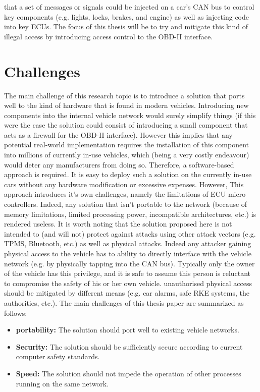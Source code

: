 \cite{MillerA}\cite{Yadav16}\cite{MillerB}\cite{MillerC} that a set of messages or signals could be injected on a car's CAN bus to control key components (e.g. lights, locks, brakes, and engine) as well as injecting code into key ECUs. The focus of this thesis will be to try and mitigate this kind of illegal access by introducing access control to the OBD-II interface.

\section{Challenges} \label{Challenges}
The main challenge of this research topic is to introduce a solution that ports well to the kind of hardware that is found in modern vehicles. Introducing new components into the internal vehicle network would surely simplify things (if this were the case the solution could consist of introducing a small component that acts as a firewall for the OBD-II interface). However this implies that any potential real-world implementation requires the installation of this component into millions of currently in-use vehicles, which (being a very costly endeavour) would deter any manufacturers from doing so. Therefore, a software-based approach is required. It is easy to deploy such a solution on the currently in-use cars without any hardware modification or excessive expenses. However, This approach introduces it's own challenges, namely the limitations of ECU micro controllers. Indeed, any solution that isn't portable to the network (because of memory limitations, limited processing power, incompatible architectures, etc.) is rendered useless. It is worth noting that the solution proposed here is not intended to (and will not) protect against attacks using other attack vectors (e.g. TPMS, Bluetooth, etc.) as well as physical attacks. Indeed any attacker gaining physical access to the vehicle has to ability to directly interface with the vehicle network (e.g. by physically tapping into the CAN bus). Typically only the owner of the vehicle has this privilege, and it is safe to assume this person is reluctant to compromise the safety of his or her own vehicle. unauthorised physical access should be mitigated by different means (e.g. car alarms, safe RKE systems, the authorities, etc.). The main challenges of this thesis paper are summarized as follows:

\begin{itemize}
	\item \textbf{portability:} The solution should port well to existing vehicle networks. 
	\item \textbf{Security:} The solution should be sufficiently secure according to current computer safety standards. 
	\item \textbf{Speed:} The solution should not impede the operation of other processes running on the same network.
\end{itemize}

